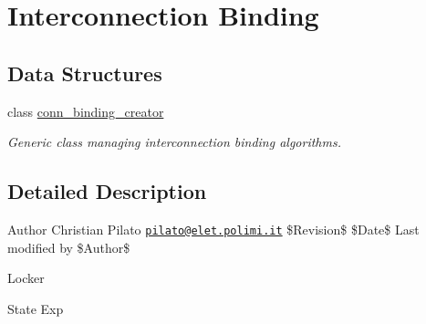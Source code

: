 \hypertarget{group__conn__binding__creator__p}{}\section{Interconnection Binding}
\label{group__conn__binding__creator__p}
\subsection*{Data Structures}
\begin{DoxyCompactItemize}
\item 
class \hyperlink{classconn__binding__creator}{conn\+\_\+binding\+\_\+creator}
\begin{DoxyCompactList}\small\item\em Generic class managing interconnection binding algorithms. \end{DoxyCompactList}\end{DoxyCompactItemize}


\subsection{Detailed Description}
\begin{DoxyAuthor}{Author}
Christian Pilato \href{mailto:pilato@elet.polimi.it}{\tt pilato@elet.\+polimi.\+it} \$\+Revision\$ \$\+Date\$ Last modified by \$\+Author\$ 
\end{DoxyAuthor}
\begin{DoxyParagraph}{Locker}

\end{DoxyParagraph}
\begin{DoxyParagraph}{State}
Exp 
\end{DoxyParagraph}
